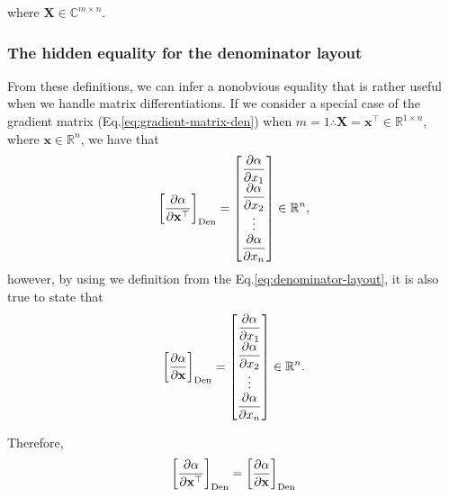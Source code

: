 \documentclass{article}
\begin{document}
where \(\mathbf{X} \in \mathbb{C}^{m \times n}\).

\subsubsection{The hidden equality for the denominator layout}

From these definitions, we can infer a nonobvious equality that is rather useful when we handle matrix differentiations. If we consider a special case of the gradient matrix (Eq.\eqref{eq:gradient-matrix-den}) when $m=1 \therefore \mathbf{X} = \mathbf{x}^\top \in \mathbb{R}^{1\times n}$, where $\mathbf{x} \in \mathbb{R}^n$, we have that
\begin{align}
    \left[\dfrac{\partial \alpha}{\partial \mathbf{x}^\top}\right]_{\textnormal{Den}} = \begin{bmatrix} \dfrac{\partial \alpha}{\partial x_{1}} \\
        \dfrac{\partial \alpha}{\partial x_{2}} \\
        \vdots \\
        \dfrac{\partial \alpha}{\partial x_{n}} \end{bmatrix} \in \mathbb{R}^{n},
\end{align}
however, by using we definition from the Eq.\eqref{eq:denominator-layout}, it is also true to state that
\begin{align}
    \left[\dfrac{\partial \alpha}{\partial \mathbf{x}}\right]_{\textnormal{Den}} = \begin{bmatrix} \dfrac{\partial \alpha}{\partial x_{1}} \\
        \dfrac{\partial \alpha}{\partial x_{2}} \\
        \vdots \\
        \dfrac{\partial \alpha}{\partial x_{n}} \end{bmatrix} \in \mathbb{R}^{n}.
\end{align}

Therefore,
\begin{align}
    \label{eq:hidden-den}
    \left[\dfrac{\partial \alpha}{\partial \mathbf{x}^\top}\right]_{\textnormal{Den}} = \left[\dfrac{\partial \alpha}{\partial \mathbf{x}}\right]_{\textnormal{Den}}
\end{align}
\end{document}
